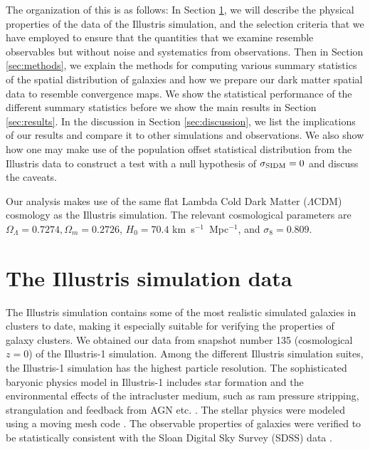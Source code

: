 The organization of this  is as follows:
In Section \ref{sec:illustris_sim}, we will describe the physical properties of 
the data of the Illustris
simulation, 
and the selection criteria that we have employed to ensure that the
quantities that we examine resemble observables but without noise and
systematics from observations. 
Then in Section \ref{sec:methods}, 
we explain the methods for computing various 
summary statistics of the spatial distribution of galaxies and how we prepare our dark
matter spatial data to resemble convergence maps. We show the statistical performance
of the different summary statistics before we show the main results
in Section \ref{sec:results}. In the discussion in Section \ref{sec:discussion}, 
we list the implications of our
results and compare it to other simulations and observations. We also 
show how one may make use of the population offset statistical distribution
from the Illustris data to construct a test with 
a null hypothesis of $\sigma_{\rm SIDM} = 0$ and discuss the caveats. 

	Our analysis makes use of the same flat Lambda Cold Dark Matter ($\Lambda$CDM) cosmology
as the Illustris simulation. The relevant cosmological parameters are
$\Omega_\Lambda = 0.7274, \Omega_m = 0.2726$, $H_0 = 70.4$
km~s$^{-1}$~Mpc$^{-1}$, and $\sigma_8 = 0.809$.

\section{The Illustris simulation data} 
\label{sec:illustris_sim}
The Illustris simulation contains some of the most
realistic simulated galaxies in clusters to date, making it especially suitable for 
verifying the properties of galaxy clusters. We obtained our data from 
snapshot number 135 (cosmological $z=0$) of the Illustris-1 simulation. 
Among the different Illustris simulation suites,
the Illustris-1 simulation has the highest particle resolution. 
The sophisticated baryonic physics model in Illustris-1 
includes star formation and the environmental effects of the intracluster medium, 
such as ram pressure stripping,
strangulation and feedback from AGN etc. \citep{Genel2014a}.
The stellar physics were modeled using a moving mesh code {} \citep{Springel2010}.
The observable properties of galaxies were verified to be statistically consistent
with the Sloan Digital Sky Survey (SDSS) data \citep{Vogelsberger2014}. 


